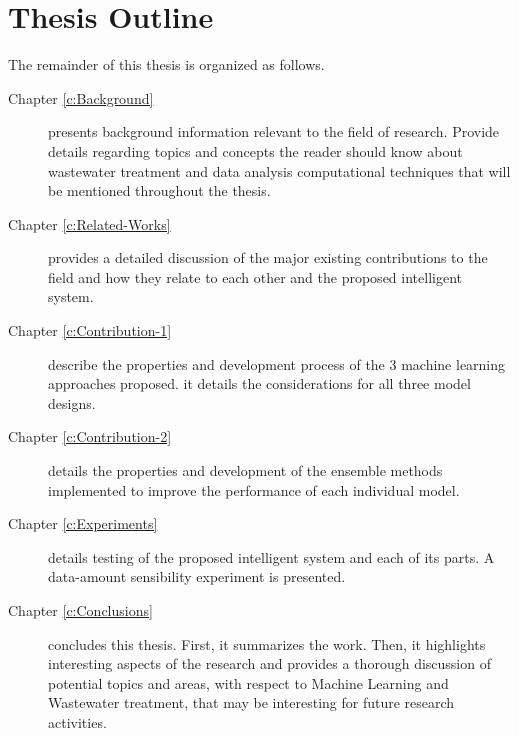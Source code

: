 \section{Thesis Outline}
\label{s:Outline}

The remainder of this thesis is organized as follows. 

\begin{description}

  \item[Chapter \ref{c:Background}] presents background information relevant to the field of research. Provide details regarding topics and concepts the reader should know about wastewater treatment and data analysis computational techniques that will be mentioned throughout the thesis.
  
  \item[Chapter \ref{c:Related-Works}] provides a detailed discussion of the major existing contributions to the field and how they relate to each other and the proposed intelligent system.
  
  \item[Chapter \ref{c:Contribution-1}] describe the properties and development process of the 3 machine learning approaches proposed. it details the considerations for all three model designs.
  
  \item[Chapter \ref{c:Contribution-2}] details the properties and development of the ensemble methods implemented to improve the performance of each individual model.
  
  \item[Chapter \ref{c:Experiments}] details testing of the proposed intelligent system and each of its parts. A data-amount sensibility experiment is presented.
  
  \item[Chapter \ref{c:Conclusions}] concludes this thesis. First, it summarizes the work. Then, it highlights interesting aspects of the research and provides a thorough discussion of potential topics and areas, with respect to Machine Learning and Wastewater treatment, that may be interesting for future research activities. 
  
\end{description}



